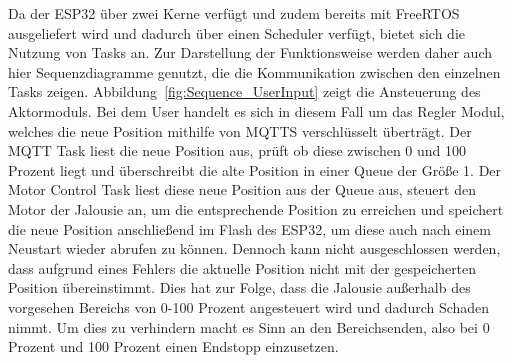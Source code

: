 Da der ESP32 über zwei Kerne verfügt und zudem bereits mit FreeRTOS ausgeliefert wird und dadurch über einen Scheduler verfügt, bietet sich die Nutzung von Tasks an. Zur Darstellung der Funktionsweise werden daher auch hier Sequenzdiagramme genutzt, die die Kommunikation zwischen den einzelnen Tasks zeigen. Abbildung~\ref{fig:Sequence_UserInput} zeigt die Ansteuerung des Aktormoduls. Bei dem User handelt es sich in diesem Fall um das Regler Modul, welches die neue Position mithilfe von MQTTS verschlüsselt überträgt. Der MQTT Task liest die neue Position aus, prüft ob diese zwischen 0 und 100 Prozent liegt und überschreibt die alte Position in einer Queue der Größe 1. Der Motor Control Task liest diese neue Position aus der Queue aus, steuert den Motor der Jalousie an, um die entsprechende Position zu erreichen und speichert die neue Position anschließend im Flash des ESP32, um diese auch nach einem Neustart wieder abrufen zu können. Dennoch kann nicht ausgeschlossen werden, dass aufgrund eines Fehlers die aktuelle Position nicht mit der gespeicherten Position übereinstimmt. Dies hat zur Folge, dass die Jalousie außerhalb des vorgesehen Bereichs von 0-100 Prozent angesteuert wird und dadurch Schaden nimmt. Um dies zu verhindern macht es Sinn an den Bereichsenden, also bei 0 Prozent und 100 Prozent einen Endstopp einzusetzen.

